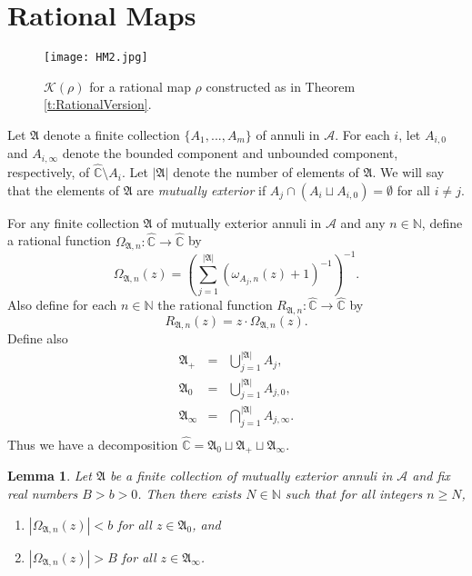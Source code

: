 \documentclass[a4paper,11pt,onecolumn]{amsart}
\newtheorem{lemma}[theorem]{Lemma}
\theoremstyle{definition}
\begin{document}
\section{Rational Maps}

  \begin{figure}[!h] 
  \centering
  \texttt{[image: HM2.jpg]}
  \caption[]{$\mathcal{K}(\rho)$ for a rational map $\rho$ constructed as in Theorem \ref{t:RationalVersion}.  }
  \end{figure}
  
  Let $\mathfrak{A}$ denote a finite collection $\{A_1,...,A_m\}$ of annuli in $\mathcal{A}$.  For each $i$, let $A_{i,0}$ and $A_{i,\infty}$ denote the bounded component and unbounded component, respectively, of $\hat{\mathbb{C}} \setminus A_i$.   Let $|\mathfrak{A}|$ denote the number of elements of $\mathfrak{A}$.  We will say that the elements of $\mathfrak{A}$ are \emph{mutually exterior} if $A_j \cap (A_i \sqcup A_{i,0}) = \emptyset$ for all $i \neq j$. 
  
  For any finite collection $\mathfrak{A}$ of mutually exterior annuli in $\mathcal{A}$ and any $n \in \mathbb{N}$, define a rational function $\Omega_{\mathfrak{A},n}:\hat{\mathbb{C}} \rightarrow \hat{\mathbb{C}}$ by 
  \begin{equation}  \label{eq:Omega}
\Omega_{\mathfrak{A},n}(z) = \left(
\sum_{j=1}^{|\mathfrak{A}|} (\omega_{A_j,n}(z) + 1)^{-1}
 \right)^{-1}.
  \end{equation}
 Also define for each $n \in \mathbb{N}$ the rational function $R_{\mathfrak{A},n}:\hat{\mathbb{C}} \rightarrow \hat{\mathbb{C}}$ by $$R_{\mathfrak{A},n}(z) = z \cdot \Omega_{\mathfrak{A},n}(z).$$
  Define also 
    $$\begin{array}{lcl}
  \mathfrak{A}_+ &=& \bigcup_{j=1}^{|\mathfrak{A}|} A_{j}, \\
  \mathfrak{A}_0 &=& \bigcup_{j=1}^{|\mathfrak{A}|} A_{j,0}, \\
  \mathfrak{A}_{\infty} &=& \bigcap_{j=1}^{|\mathfrak{A}|} A_{j,\infty}. \\
  \end{array}$$
  Thus we have a decomposition $\hat{\mathbb{C}} = \mathfrak{A}_0 \sqcup \mathfrak{A}_+ \sqcup \mathfrak{A}_{\infty}$.  
  
  \begin{lemma} \label{l:controlOnLotsOfAnnuli}
  Let $\mathfrak{A}$ be a finite collection of mutually exterior annuli in $\mathcal{A}$ and fix real numbers $B > b > 0$.  Then there exists $N \in \mathbb{N}$ such that for all integers $n \geq N$, 
  \begin{enumerate}
  \item $|\Omega_{\mathfrak{A},n}(z)| < b$ for all $z \in \mathfrak{A}_0$, and
  \item $|\Omega_{\mathfrak{A},n}(z)| > B$ for all $z \in \mathfrak{A}_{\infty}$.  
  \end{enumerate}
  \end{lemma}
  
\end{document}
